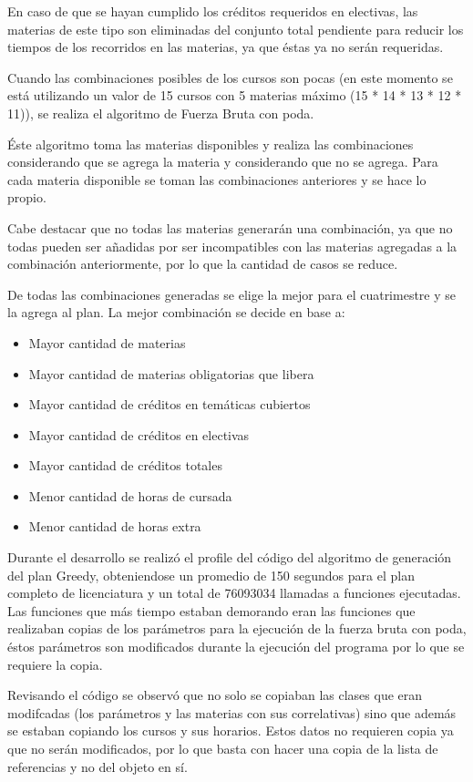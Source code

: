 \documentclass[a4paper]{article}
\begin{document}
En caso de que se hayan cumplido los créditos requeridos en electivas, las materias de este tipo son eliminadas del conjunto total pendiente para reducir los tiempos de los recorridos en las materias, ya que éstas ya no serán requeridas.

Cuando las combinaciones posibles de los cursos son pocas (en este momento se está utilizando un valor de 15 cursos con 5 materias máximo (15 * 14 * 13 * 12 * 11)), se realiza el algoritmo de Fuerza Bruta con poda.

Éste algoritmo toma las materias disponibles y realiza las combinaciones considerando que se agrega la materia y considerando que no se agrega. Para cada materia disponible se toman las combinaciones anteriores y se hace lo propio.

Cabe destacar que no todas las materias generarán una combinación, ya que no todas pueden ser añadidas por ser incompatibles con las materias agregadas a la combinación anteriormente, por lo que la cantidad de casos se reduce.

De todas las combinaciones generadas se elige la mejor para el cuatrimestre y se la agrega al plan. La mejor combinación se decide en base a:

\begin{itemize}
	\item Mayor cantidad de materias
	\item Mayor cantidad de materias obligatorias que libera
	\item Mayor cantidad de créditos en temáticas cubiertos
	\item Mayor cantidad de créditos en electivas
	\item Mayor cantidad de créditos totales
	\item Menor cantidad de horas de cursada
	\item Menor cantidad de horas extra
\end{itemize}

Durante el desarrollo se realizó el profile del código del algoritmo de generación del plan Greedy, obteniendose un promedio de 150 segundos para el plan completo de licenciatura y un total de 76093034 llamadas a funciones ejecutadas. Las funciones que más tiempo estaban demorando eran las funciones que realizaban copias de los parámetros para la ejecución de la fuerza bruta con poda, éstos parámetros son modificados durante la ejecución del programa por lo que se requiere la copia.

Revisando el código se observó que no solo se copiaban las clases que eran modifcadas (los parámetros y las materias con sus correlativas) sino que además se estaban copiando los cursos y sus horarios. Estos datos no requieren copia ya que no serán modificados, por lo que basta con hacer una copia de la lista de referencias y no del objeto en sí.
\end{document}
